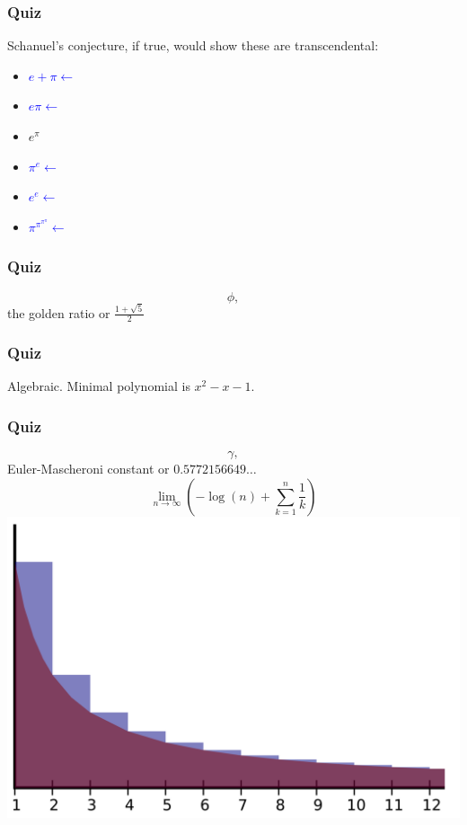 \documentclass{beamer}
\begin{document}
    \begin{frame}
        \frametitle{Quiz}
        Schanuel's conjecture, if true, would show these are transcendental:
        \begin{center}
            \begin{itemize}
                \item{\textcolor{blue}{$e+\pi\leftarrow$}}
                \item{\textcolor{blue}{$e\pi\leftarrow$}}
                \item{$e^{\pi}$}
                \item{\textcolor{blue}{$\pi^{e}\leftarrow$}}
                \item{\textcolor{blue}{${e}^{e}\leftarrow$}}
                \item{\textcolor{blue}{${\pi}^{{\pi^{\pi^{\pi}}}}\leftarrow$}}
            \end{itemize}
        \end{center}
    \end{frame}

    
    \begin{frame}
        \frametitle{Quiz}
        \begin{center}
            \[\phi,\] 
            the golden ratio or $\frac{1+\sqrt{5}}{2}$
        \end{center}
    \end{frame}

    \begin{frame}
        \frametitle{Quiz}
        \begin{center}
            Algebraic. Minimal polynomial is $x^2 - x - 1$.
        \end{center}
    \end{frame}

    \begin{frame}
        \frametitle{Quiz}
        \begin{center}
            \[\gamma,\] 
            Euler-Mascheroni constant or $0.5772156649\ldots$
            \[\lim\limits_{n \to \infty}\left(-\log(n) + \sum\limits_{k=1}^{n}\frac{1}{k}\right)\]
            \includegraphics[scale=0.05]{img/em.png}
        \end{center}
    \end{frame}
\end{document}

